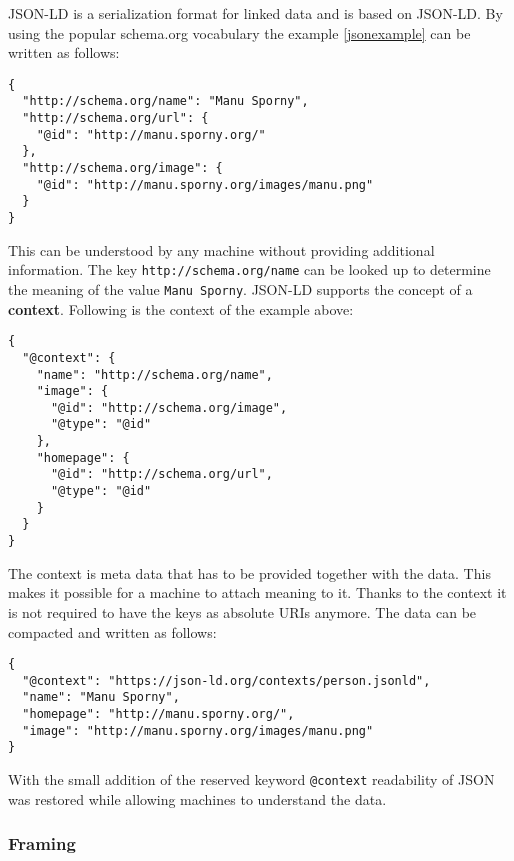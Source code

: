JSON-LD is a serialization format for linked data and is based on JSON-LD. By using the popular schema.org vocabulary the example \ref{jsonexample} can be written as follows:

\lstset{language=JSON}
\begin{lstlisting}[caption=Data of a person in the JSON-LD format, label=jsonldexample]
{
  "http://schema.org/name": "Manu Sporny",
  "http://schema.org/url": {
    "@id": "http://manu.sporny.org/"
  },
  "http://schema.org/image": {
    "@id": "http://manu.sporny.org/images/manu.png"
  }
}
\end{lstlisting}

This can be understood by any machine without providing additional information. The key \lstinline{http://schema.org/name} can be looked up to determine the meaning of the value \lstinline{Manu Sporny}. JSON-LD supports the concept of a \textbf{context}. Following is the context of the example above:

\newpage

\lstset{language=JSON}
\begin{lstlisting}[caption=Context of the example data at https://json-ld.org/contexts/person.jsonld, label=jsonlcontextexample]
{
  "@context": {
    "name": "http://schema.org/name",
    "image": {
      "@id": "http://schema.org/image",
      "@type": "@id"
    },
    "homepage": {
      "@id": "http://schema.org/url",
      "@type": "@id"
    }
  }
}
\end{lstlisting}

The context is meta data that has to be provided together with the data. This makes it possible for a machine to attach meaning to it. Thanks to the context it is not required to have the keys as absolute URIs anymore. The data can be compacted and written as follows:

\lstset{language=JSON}
\begin{lstlisting}[caption=Compacted data of a person, label=jsonldcompacted]
{
  "@context": "https://json-ld.org/contexts/person.jsonld",
  "name": "Manu Sporny",
  "homepage": "http://manu.sporny.org/",
  "image": "http://manu.sporny.org/images/manu.png"
}
\end{lstlisting}

With the small addition of the reserved keyword \lstinline{@context} readability of JSON was restored while allowing machines to understand the data.

\subsubsection{Framing}\label{jsonldframing}

